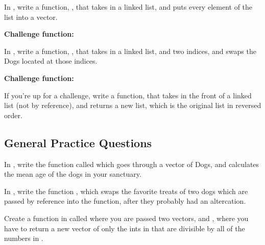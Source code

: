 \documentclass{tufte-handout}
\begin{document}
\medskip \noindent
\textbf{}
\medskip

\noindent In , write a function, , that takes in a linked list, and puts every element of the list into a vector.

\medskip \noindent
\textbf{Challenge function: }
\medskip

\noindent In , write a function, , that takes in a linked list, and two indices, and swaps the Dogs located at those indices. 

\medskip \noindent
\textbf{Challenge function: }
\medskip

\noindent If you're up for a challenge, write a function,  that takes in the front of a linked list (not by reference), and returns a new list, which is the original list in reversed order.  

\subsection{General Practice Questions}

\medskip \noindent
\textbf{}
\medskip

\noindent In , write the function called  which goes through a vector of Dogs, and calculates the mean age of the dogs in your sanctuary.

\medskip \noindent
\textbf{}
\medskip

\noindent In , write the function , which swaps the favorite treats of two dogs which are passed by reference into the function, after they probably had an altercation.

\medskip \noindent
\textbf{}
\medskip

\noindent Create a function in  called  where you are passed two vectors,  and , where you have to return a new vector of only the ints in  that are divisible by all of the numbers in .
\end{document}
